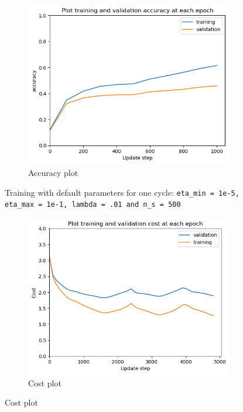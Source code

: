 \documentclass[12pt]{article}
\newenvironment{question}[2][Question]{\begin{trivlist}
\kern10pt
\item[\hskip \labelsep {\bfseries #1}\hskip \labelsep {\bfseries #2.}]}{\end{trivlist}}
\begin{document}
\begin{question}{ii}
\begin{figure}[!htb]
\begin{subfigure}[b]{0.32\textwidth}
        \includegraphics[width=\linewidth]{f3_acc_plt.png}
        \caption{Accuracy plot}
    \end{subfigure}
    \caption{
        Training with default parameters for one cycle:
        \texttt{eta\_min = 1e-5, eta\_max = 1e-1,  lambda = .01 and n\_s = 500}
    }
    \label{fig:replicate_f3}
\end{figure}
\begin{figure}[!htb]
    \begin{subfigure}[b]{0.32\textwidth}
        \includegraphics[width=\linewidth]{f4_cost_plt.png}
        \caption{Cost plot}
    \end{subfigure}

\end{figure}
\end{question}
\end{document}
